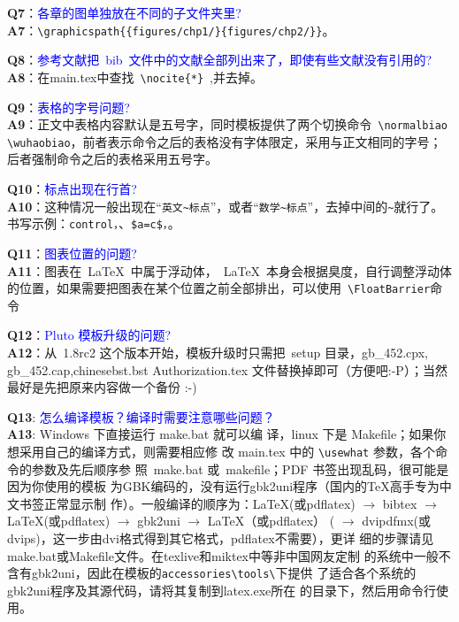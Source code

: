 \noindent \textbf{Q7}：\textcolor{blue}{各章的图单独放在不同的子文件夹里?}\\
\textbf{A7}：\verb+\graphicspath{{figures/chp1/}{figures/chp2/}}+。

\noindent \textbf{Q8}：\textcolor{blue}{参考文献把~bib~文件中的文献全部列出来了，即使有些文献没有引用的?}\\
\textbf{A8}：在main.tex中查找~\verb+\nocite{*}+~,并去掉。

\noindent \textbf{Q9}：\textcolor{blue}{表格的字号问题?}\\
\textbf{A9}：正文中表格内容默认是五号字，同时模板提供了两个切换命令~\verb+\normalbiao \wuhaobiao+，前者表示命令之后的表格没有字体限定，采用与正文相同的字号；后者强制命令之后的表格采用五号字。

\noindent \textbf{Q10}：\textcolor{blue}{标点出现在行首?}\\
\textbf{A10}：这种情况一般出现在“\verb+英文~标点+”，或者“\verb+数学~标点+”，去掉中间的\verb+~+就行了。书写示例：\verb+control，+、\verb+$a=c$，+。

\noindent \textbf{Q11}：\textcolor{blue}{图表位置的问题?}\\
\textbf{A11}：图表在~\LaTeX~中属于浮动体，~\LaTeX~本身会根据臭度，自行调整浮动体的位置，如果需要把图表在某个位置之前全部排出，可以使用~\verb+\FloatBarrier+命令

\noindent \textbf{Q12}：\textcolor{blue}{Pluto 模板升级的问题?}\\
\textbf{A12}：从~1.8rc2 这个版本开始，模板升级时只需把~setup 目录，gb\_452.cpx, gb\_452.cap,chinesebst.bst Authorization.tex 文件替换掉即可（方便吧:-P）；当然最好是先把原来内容做一个备份 :-)

\noindent \textbf{Q13}: \textcolor{blue}{怎么编译模板？编译时需要注意哪些问题？}\\
\textbf{A13}: Windows 下直接运行 make.bat 就可以编
译，linux 下是 Makefile；如果你想采用自己的编译方式，则需要相应修
改 main.tex 中的 \verb+\usewhat+ 参数，各个命令的参数及先后顺序参
照~make.bat 或~makefile；PDF 书签出现乱码，很可能是因为你使用的模板
为GBK编码的，没有运行gbk2uni程序（国内的TeX高手专为中文书签正常显示制
作）。一般编译的顺序为：LaTeX(或pdflatex) $\rightarrow$ bibtex $\rightarrow$
LaTeX(或pdflatex) $\rightarrow$ gbk2uni $\rightarrow$ LaTeX（或pdflatex） ( $\rightarrow$
dvipdfmx(或dvips)，这一步由dvi格式得到其它格式，pdflatex不需要），更详
细的步骤请见make.bat或Makefile文件。在texlive和miktex中等非中国网友定制
的系统中一般不含有gbk2uni，因此在模板的\verb|accessories\tools\|下提供
了适合各个系统的gbk2uni程序及其源代码，请将其复制到latex.exe所在
的目录下，然后用命令行使用。

